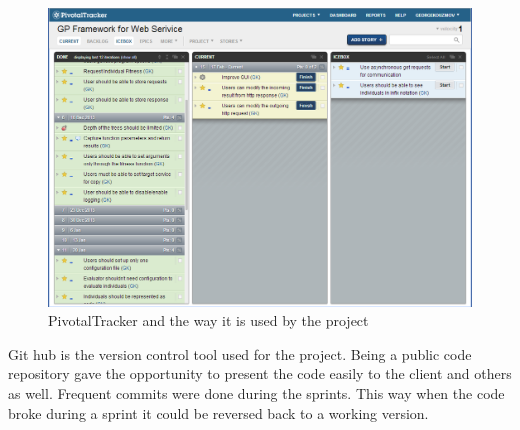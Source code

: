 \begin{figure}[htp]
\centering
\includegraphics[scale=0.6]{Figures/pivotalTracker.png}
\caption{PivotalTracker and the way it is used by the project}
\label{fig:pivotalTracker}
\end{figure}

Git hub is the version control tool used for the project. Being a public code repository gave the opportunity to present the code easily to the client and
others as well. Frequent commits were done during the sprints. This way when the code broke during a sprint it could be reversed back to a working version.

